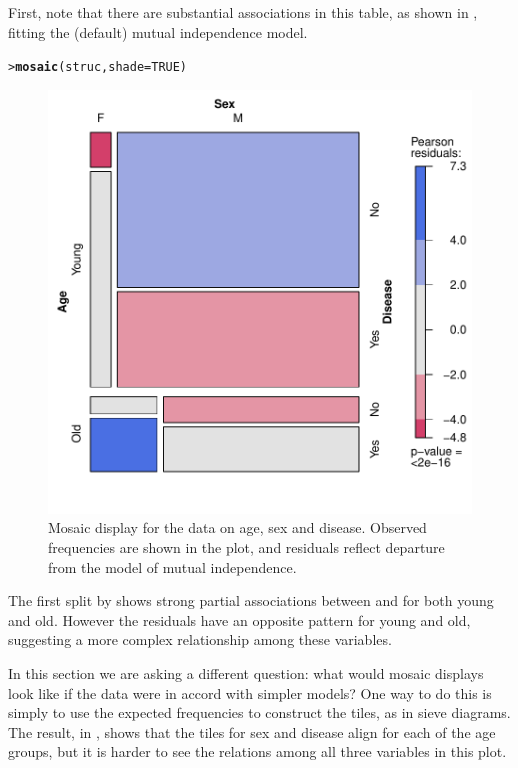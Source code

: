 \documentclass[10pt,krantz2]{krantz}\usepackage[]{graphicx}\usepackage[]{color}
\makeatletter
\newcommand{\hlnum}[1]{\textcolor[rgb]{0.686,0.059,0.569}{#1}}%
\newcommand{\hlstd}[1]{\textcolor[rgb]{0.345,0.345,0.345}{#1}}%
\newcommand{\hlkwc}[1]{\textcolor[rgb]{0.333,0.667,0.333}{#1}}%
\newcommand{\hlkwd}[1]{\textcolor[rgb]{0.737,0.353,0.396}{\textbf{#1}}}%
\newenvironment{kframe}{%
 \def\at@end@of@kframe{}%
 \ifinner\ifhmode%
  \def\at@end@of@kframe{\end{minipage}}%
  \begin{minipage}{\columnwidth}%
 \fi\fi%
 \def\FrameCommand##1{\hskip\@totalleftmargin \hskip-\fboxsep
 \colorbox{shadecolor}{##1}\hskip-\fboxsep
     \hskip-\linewidth \hskip-\@totalleftmargin \hskip\columnwidth}%
 \MakeFramed {\advance\hsize-\width
   \@totalleftmargin\z@ \linewidth\hsize
   \@setminipage}}%
 {\par\unskip\endMakeFramed%
 \at@end@of@kframe}
\newenvironment{knitrout}{}{} %
\renewenvironment{knitrout}{\small\renewcommand{\baselinestretch}{.85}}{} %
\makeatother
\begin{document}
First, note that there are substantial associations in this table, as shown in
, fitting the (default) mutual independence model.
\begin{knitrout}
\color{fgcolor}\begin{kframe}
\begin{alltt}
\hlstd{> }\hlkwd{mosaic}\hlstd{(struc,} \hlkwc{shade} \hlstd{=} \hlnum{TRUE}\hlstd{)}
\end{alltt}
\end{kframe}\begin{figure}[!htbp]

\centerline{\includegraphics[width=.6\textwidth]{ch05/fig/struc-mos1-1} }

\caption[Mosaic display for the data on age, sex and disease]{Mosaic display for the data on age, sex and disease. Observed frequencies are shown in the plot, and residuals reflect departure from the model of mutual independence.\label{fig:struc-mos1}}
\end{figure}


\end{knitrout}
The first split by  shows strong partial
associations between  and  for both young and old.
However the residuals have an opposite pattern for young and old, suggesting
a more complex relationship among these variables.

In this section we are asking a different question: what would mosaic displays look
like if the data were in accord with simpler models?  One way to do this is simply
to use the expected frequencies to construct the tiles, as in sieve diagrams.
The result, in , shows that the tiles for sex and disease
align for each of the age groups, but it is harder to see the relations among all
three variables in this plot.
\end{document}
